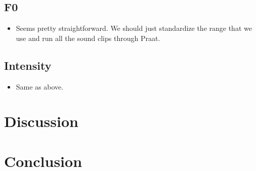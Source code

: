 \documentclass[12pt]{article}
\begin{document}
\subsection{F0}
\begin{itemize}
\item Seems pretty straightforward. We should just standardize the range that we use and run all the sound clips through Praat. 
\end{itemize}

\subsection{Intensity}
\begin{itemize}
\item Same as above.
\end{itemize}

\section{Discussion}

\section{Conclusion}

%
\end{document}
